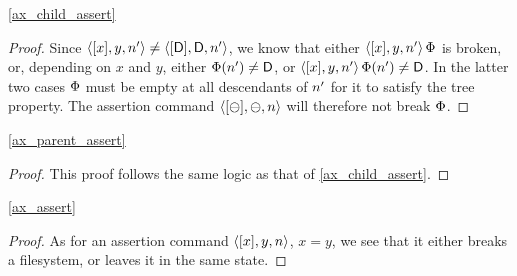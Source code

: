 \cref{ax_child_assert}

\begin{proof}
Since $\langle{[x],y,n'}\rangle\neq\langle{[\mathsf{D}],\mathsf{D},n'}\rangle$, we know that
either $\langle{[x],y,n'}\rangle\,\Phi$ is broken, or, depending on $x$ and $y$,
either $\Phi(n')\neq\mathsf{D}$, or $\langle{[x],y,n'}\rangle\,\Phi(n')\neq\mathsf{D}$.
In the latter two cases $\Phi$ must be empty at all descendants of $n'$
for it to satisfy the tree property.
The assertion command $\langle{[\ominus],\ominus,n}\rangle$ will therefore not break $\Phi$.
\end{proof}

\cref{ax_parent_assert}

\begin{proof}
This proof follows the same logic as that of \cref{ax_child_assert}.
\end{proof}

\cref{ax_assert}

\begin{proof}
As for an assertion command $\langle{[x],y,n}\rangle$, $x=y$, we see that it either
breaks a filesystem, or leaves it in the same state.
\end{proof}
